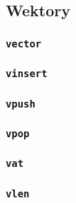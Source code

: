 \subsection{Wektory}
\label{viua_vm_ops_vector}

\subsubsection{\texttt{vector}}
\subsubsection{\texttt{vinsert}}
\subsubsection{\texttt{vpush}}
\subsubsection{\texttt{vpop}}
\subsubsection{\texttt{vat}}
\subsubsection{\texttt{vlen}}
